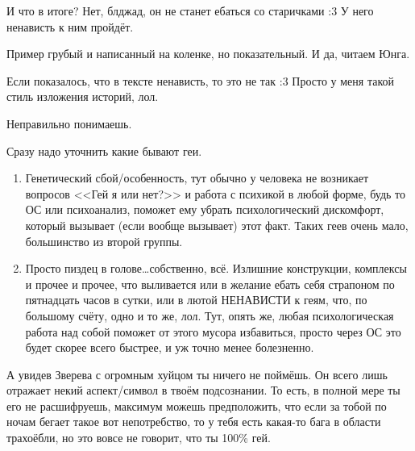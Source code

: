 \documentclass[a5paper,12pt,twoside]{memoir}
\begin{document}
И что в итоге? Нет, блджад, он не станет ебаться со старичками :3 У него ненависть к ним пройдёт. 

Пример грубый и написанный на коленке, но показательный. И да, читаем Юнга. 

Если показалось, что в тексте ненависть, то это не так :3 Просто у меня такой стиль изложения историй, лол.

\medskip


\medskip

Неправильно понимаешь.

Сразу надо уточнить какие бывают геи.

\begin{enumerate}
\item Генетический сбой/особенность, тут обычно у человека не возникает вопросов <<Гей я или нет?>> и работа с психикой в любой форме, будь то ОС или психоанализ, поможет ему убрать психологический дискомфорт, который вызывает (если вообще вызывает) этот факт. Таких геев очень мало, большинство из второй группы.
\item Просто пиздец в голове\ldots собственно, всё. Излишние конструкции, комплексы и прочее и прочее, что выливается или в желание ебать себя страпоном по пятнадцать часов в сутки, или в лютой НЕНАВИСТИ к геям, что, по большому счёту, одно и то же, лол. Тут, опять же, любая психологическая работа над собой поможет от этого мусора избавиться, просто через ОС это будет скорее всего быстрее, и уж точно менее болезненно.
\end{enumerate}


А увидев Зверева с огромным хуйцом ты ничего не поймёшь. Он всего лишь отражает некий аспект/символ в твоём подсознании. То есть, в полной мере ты его не расшифруешь, максимум можешь предположить, что если за тобой по ночам бегает такое вот непотребство, то у тебя есть какая-то бага в области трахоёбли, но это вовсе не говорит, что ты 100\% гей. 
\end{document}
